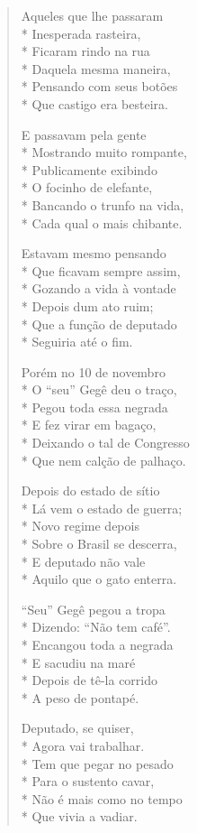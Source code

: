 \begin{verse}
Aqueles que lhe passaram\\*
Inesperada rasteira,\\*
Ficaram rindo na rua\\*
Daquela mesma maneira,\\*
Pensando com seus botões\\*
Que castigo era besteira.

E passavam pela gente\\*
Mostrando muito rompante,\\*
Publicamente exibindo\\*
O focinho de elefante,\\*
Bancando o trunfo na vida,\\*
Cada qual o mais chibante.

Estavam mesmo pensando\\*
Que ficavam sempre assim,\\*
Gozando a vida à vontade\\*
Depois dum ato ruim;\\*
Que a função de deputado\\*
Seguiria até o fim.

Porém no 10 de novembro\\*
O “seu” Gegê deu o traço,\\*
Pegou toda essa negrada\\*
E fez virar em bagaço,\\*
Deixando o tal de Congresso\\*
Que nem calção de palhaço.

Depois do estado de sítio\\*
Lá vem o estado de guerra;\\*
Novo regime depois\\*
Sobre o Brasil se descerra,\\*
E deputado não vale\\*
Aquilo que o gato enterra.

“Seu” Gegê pegou a tropa\\*
Dizendo: “Não tem café”.\\*
Encangou toda a negrada\\*
E sacudiu na maré\\*
Depois de tê-la corrido\\*
A peso de pontapé.

Deputado, se quiser,\\*
Agora vai trabalhar.\\*
Tem que pegar no pesado\\*
Para o sustento cavar,\\*
Não é mais como no tempo\\*
Que vivia a vadiar.


\end{verse}
